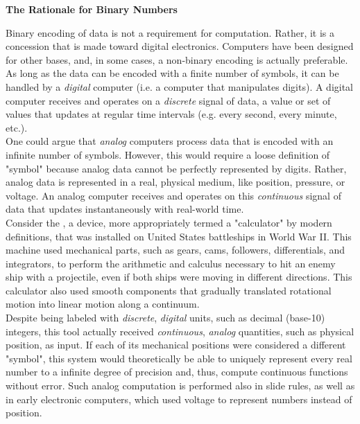 \begin{tcolorbox}[breakable, enhanced, colback=textbook-blue, sharp corners]
	\vspace{2mm}
	\begin{center}
		\textbf{The Rationale for Binary Numbers}
	\end{center}
	\vspace{1mm}
	
	Binary encoding of data is not a requirement for computation. Rather, it is a concession that is made toward digital electronics. Computers have been designed for other bases, and, in some cases, a non-binary encoding is actually preferable. As long as the data can be encoded with a finite number of symbols, it can be handled by a \textit{digital} computer (i.e. a computer that manipulates digits). A digital computer receives and operates on a \textit{discrete} signal of data, a value or set of values that updates at regular time intervals (e.g. every second, every minute, etc.). \\
	
	One could argue that \textit{analog} computers process data that is encoded with an infinite number of symbols. However, this would require a loose definition of "symbol" because analog data cannot be perfectly represented by digits. Rather, analog data is represented in a real, physical medium, like position, pressure, or voltage. An analog computer receives and operates on this \textit{continuous} signal of data that updates instantaneously with real-world time.  \\
	
	Consider the  , a device, more appropriately termed a "calculator" by modern definitions, that was installed on United States battleships in World War II. This machine used mechanical parts, such as gears, cams, followers, differentials, and integrators, to perform the arithmetic and calculus necessary to hit an enemy ship with a projectile, even if both ships were moving in different directions. This calculator also used smooth components that gradually translated rotational motion into linear motion along a continuum. \\
	
	Despite being labeled with \textit{discrete}, \textit{digital} units, such as decimal (base-10) integers, this tool actually received \textit{continuous}, \textit{analog} quantities, such as physical position, as input. If each of its mechanical positions were considered a different "symbol", this system would theoretically be able to uniquely represent every real number to a infinite degree of precision and, thus, compute continuous functions without error. Such analog computation is performed also in slide rules, as well as in early electronic computers, which used voltage to represent numbers instead of position. \\
	

\end{tcolorbox}
